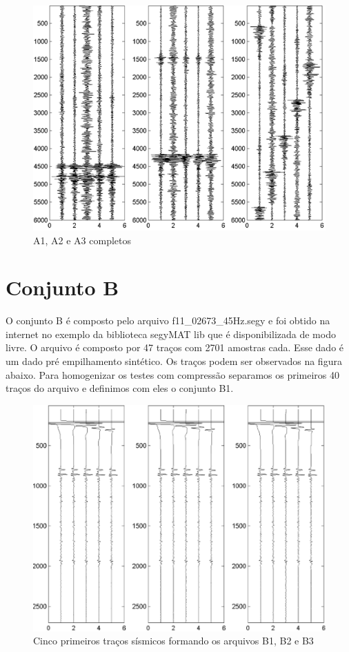 \begin{figure}[!h]
\centering
  \includegraphics[scale=0.75]{fig/fig_A2.png}
  \caption{A1, A2 e A3 completos}
  \label{Figura:a1a2a3comp}
\end{figure}

\section{Conjunto B}

O conjunto B é composto pelo arquivo f11\_02673\_45Hz.segy e foi obtido na
internet no exemplo da biblioteca segyMAT lib que é disponibilizada de modo
livre. O arquivo é composto por 47 traços com 2701 amostras cada. Esse dado é um
dado pré empilhamento sintético.  Os traços podem ser observados na figura
abaixo. Para homogenizar os testes com compressão separamos os primeiros 40
traços do arquivo e definimos com eles o conjunto B1.


\begin{figure}[!h]
\centering
\includegraphics[scale=1]{fig/fig_B1.png}
\caption[Primeiros traços de B1, B2 e B3]{Cinco primeiros traços sísmicos
formando os arquivos B1, B2 e B3}
\end{figure}


